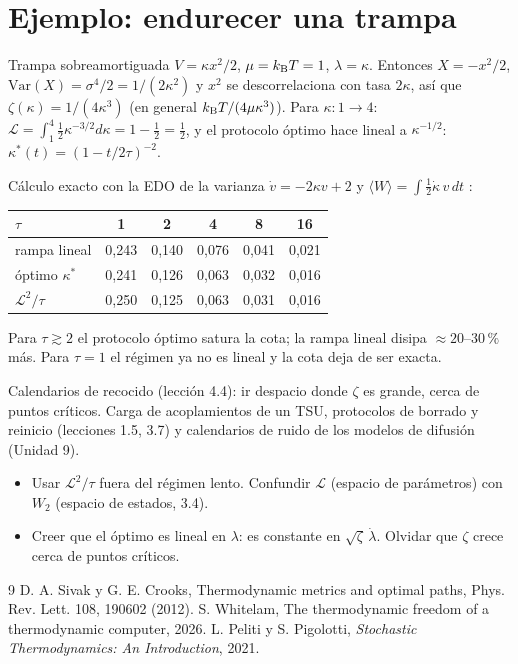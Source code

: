 \documentclass[11pt,a4paper]{article}
\begin{document}
\section{Ejemplo: endurecer una trampa}
Trampa sobreamortiguada $V=\kappa x^2/2$, $\mu=k_{\mathrm B} T=1$, $\lambda=\kappa$. Entonces $X=-x^2/2$, $\mathrm{Var}(X)=\sigma^4/2=1/(2\kappa^2)$ y $x^2$
se descorrelaciona con tasa $2\kappa$, así que $\zeta(\kappa)=1/(4\kappa^3)$ (en general $k_{\mathrm B} T/(4\mu\kappa^3)$). Para $\kappa:1\to4$:
$\mathcal L=\int_1^4\tfrac12\kappa^{-3/2}d\kappa=1-\tfrac12=\tfrac12$, y el protocolo óptimo hace lineal a $\kappa^{-1/2}$:
$\kappa^*(t)=(1-t/2\tau)^{-2}$.
\begin{ejemplo}
Cálculo exacto con la EDO de la varianza $\dot v=-2\kappa v+2$ y $\langle W\rangle=\int\tfrac12\dot\kappa\,v\,dt$ \evS:
\begin{center}\begin{tabular}{lccccc}\toprule
$\tau$ & 1 & 2 & 4 & 8 & 16\\\midrule
rampa lineal & 0,243 & 0,140 & 0,076 & 0,041 & 0,021\\
óptimo $\kappa^*$ & 0,241 & 0,126 & 0,063 & 0,032 & 0,016\\
$\mathcal L^2/\tau$ & 0,250 & 0,125 & 0,063 & 0,031 & 0,016\\\bottomrule\end{tabular}\end{center}
Para $\tau\gtrsim2$ el protocolo óptimo satura la cota; la rampa lineal disipa $\approx20$--$30\,\%$ más. Para $\tau=1$ el régimen ya no es lineal
y la cota deja de ser exacta.
\end{ejemplo}

\begin{aplicacion}
Calendarios de recocido (lección 4.4): ir despacio donde $\zeta$ es grande, cerca de puntos críticos. Carga de acoplamientos de un TSU,
protocolos de borrado y reinicio (lecciones 1.5, 3.7) y calendarios de ruido de los modelos de difusión (Unidad 9).
\end{aplicacion}

\begin{error}
\begin{itemize}[nosep]
\item Usar $\mathcal L^2/\tau$ fuera del régimen lento. \quad Confundir $\mathcal L$ (espacio de parámetros) con $W_2$ (espacio de estados, 3.4).
\item Creer que el óptimo es lineal en $\lambda$: es constante en $\sqrt\zeta\,\dot\lambda$. \quad Olvidar que $\zeta$ crece cerca de puntos críticos.
\end{itemize}
\end{error}

\begin{thebibliography}{9}\small
{} D. A. Sivak y G. E. Crooks, Thermodynamic metrics and optimal paths, Phys. Rev. Lett. 108, 190602 (2012).
 S. Whitelam, The thermodynamic freedom of a thermodynamic computer, 2026.
 L. Peliti y S. Pigolotti, \emph{Stochastic Thermodynamics: An Introduction}, 2021.
\end{thebibliography}
\end{document}

